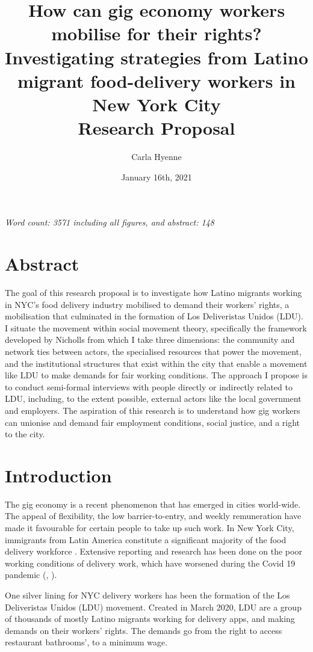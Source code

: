 \documentclass{article}[12pt]
\title{How can gig economy workers mobilise for their rights? Investigating strategies from Latino migrant food-delivery workers in New York City \\[5ex]Research Proposal \\[3ex]}
\author{Carla Hyenne}
\date{January 16th, 2021}
\begin{document}
\maketitle

\textit{Word count: 3571 including all figures, and abstract: 148}

\section{Abstract}

The goal of this research proposal is to investigate how Latino migrants working in NYC’s food delivery industry mobilised to demand their workers’ rights, a mobilisation that culminated in the formation of Los Deliveristas Unidos (LDU).
I situate the movement within social movement theory, specifically the framework developed by Nicholls from which I take three dimensions: the community and network ties between actors, the specialised resources that power the movement, and the institutional structures that exist within the city that enable a movement like LDU to make demands for fair working conditions.
The approach I propose is to conduct semi-formal interviews with people directly or indirectly related to LDU, including, to the extent possible, external actors like the local government and employers.
The aspiration of this research is to understand how gig workers can unionise and demand fair employment conditions, social justice, and a right to the city.

\pagebreak

\section{Introduction}

The gig economy is a recent phenomenon that has emerged in cities world-wide. The appeal of flexibility, the low barrier-to-entry, and weekly remuneration have made it favourable for certain people to take up such work. In New York City, immigrants from Latin America constitute a significant majority of the food delivery workforce \parencite{ldu_report2021}. Extensive reporting and research has been done on the poor working conditions of delivery work, which have worsened during the Covid 19 pandemic (\parencite{newyorker2020uncertain}, \parencite{nytimes2021risk}).

One silver lining for NYC delivery workers has been the formation of the Los Deliveristas Unidos (LDU) movement. Created in March 2020, LDU are a group of thousands of mostly Latino migrants working for delivery apps, and making demands on their workers’ rights. The demands go from the right to access restaurant bathrooms’, to a minimum wage. 
\end{document}
